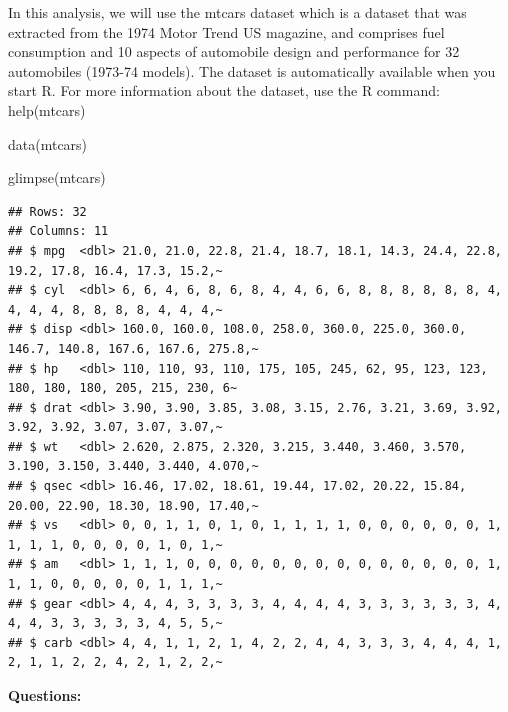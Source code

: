 \documentclass[
]{book}
\newenvironment{Shaded}{\begin{snugshade}}{\end{snugshade}}
\newcommand{\FunctionTok}[1]{\textcolor[rgb]{0.00,0.00,0.00}{#1}}
\newcommand{\NormalTok}[1]{#1}
\theoremstyle{definition}
\theoremstyle{definition}
\theoremstyle{definition}
\theoremstyle{definition}
\theoremstyle{remark}
\begin{document}
In this analysis, we will use the mtcars dataset which is a dataset that was extracted from the 1974 Motor Trend US magazine, and comprises fuel consumption and 10 aspects of automobile design and performance for 32 automobiles (1973-74 models). The dataset is automatically available when you start R. For more information about the dataset, use the R command: help(mtcars)

\begin{Shaded}
\begin{Highlighting}[]
\FunctionTok{data}\NormalTok{(mtcars)}

\FunctionTok{glimpse}\NormalTok{(mtcars)}
\end{Highlighting}
\end{Shaded}

\begin{verbatim}
## Rows: 32
## Columns: 11
## $ mpg  <dbl> 21.0, 21.0, 22.8, 21.4, 18.7, 18.1, 14.3, 24.4, 22.8, 19.2, 17.8, 16.4, 17.3, 15.2,~
## $ cyl  <dbl> 6, 6, 4, 6, 8, 6, 8, 4, 4, 6, 6, 8, 8, 8, 8, 8, 8, 4, 4, 4, 4, 8, 8, 8, 8, 4, 4, 4,~
## $ disp <dbl> 160.0, 160.0, 108.0, 258.0, 360.0, 225.0, 360.0, 146.7, 140.8, 167.6, 167.6, 275.8,~
## $ hp   <dbl> 110, 110, 93, 110, 175, 105, 245, 62, 95, 123, 123, 180, 180, 180, 205, 215, 230, 6~
## $ drat <dbl> 3.90, 3.90, 3.85, 3.08, 3.15, 2.76, 3.21, 3.69, 3.92, 3.92, 3.92, 3.07, 3.07, 3.07,~
## $ wt   <dbl> 2.620, 2.875, 2.320, 3.215, 3.440, 3.460, 3.570, 3.190, 3.150, 3.440, 3.440, 4.070,~
## $ qsec <dbl> 16.46, 17.02, 18.61, 19.44, 17.02, 20.22, 15.84, 20.00, 22.90, 18.30, 18.90, 17.40,~
## $ vs   <dbl> 0, 0, 1, 1, 0, 1, 0, 1, 1, 1, 1, 0, 0, 0, 0, 0, 0, 1, 1, 1, 1, 0, 0, 0, 0, 1, 0, 1,~
## $ am   <dbl> 1, 1, 1, 0, 0, 0, 0, 0, 0, 0, 0, 0, 0, 0, 0, 0, 0, 1, 1, 1, 0, 0, 0, 0, 0, 1, 1, 1,~
## $ gear <dbl> 4, 4, 4, 3, 3, 3, 3, 4, 4, 4, 4, 3, 3, 3, 3, 3, 3, 4, 4, 4, 3, 3, 3, 3, 3, 4, 5, 5,~
## $ carb <dbl> 4, 4, 1, 1, 2, 1, 4, 2, 2, 4, 4, 3, 3, 3, 4, 4, 4, 1, 2, 1, 1, 2, 2, 4, 2, 1, 2, 2,~
\end{verbatim}

\textbf{Questions:}
\end{document}
